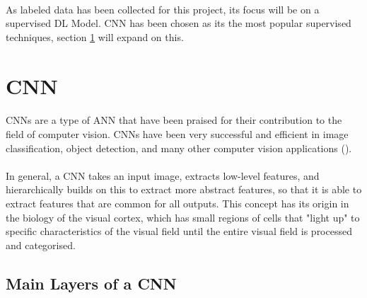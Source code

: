 \paragraph{}
As labeled data has been collected for this project, its focus will be on a supervised \gls{DL} Model. \gls{CNN} has been chosen as its the most popular supervised techniques, section \ref{cnn_subsect} will expand on this.



\section{\gls{CNN}} \label{cnn_subsect}
\paragraph{}

\gls{CNN}s are a type of \gls{ANN} that have been praised for their contribution to the field of computer vision. \gls{CNN}s have been very successful and efficient in image classification, object detection, and many other computer vision applications (\cite{GoodBengCour16}).
\paragraph{}
In general, a \gls{CNN} takes an input image, extracts low-level features, and hierarchically builds on this to extract more abstract features, so that it is able to extract features that are common for all outputs. This concept has its origin in the biology of the visual cortex, which has small regions of cells that "light up" to specific characteristics of the visual field until the entire visual field is processed and categorised.

\subsection{Main Layers of a \gls{CNN}} \label{cnn_layers}

